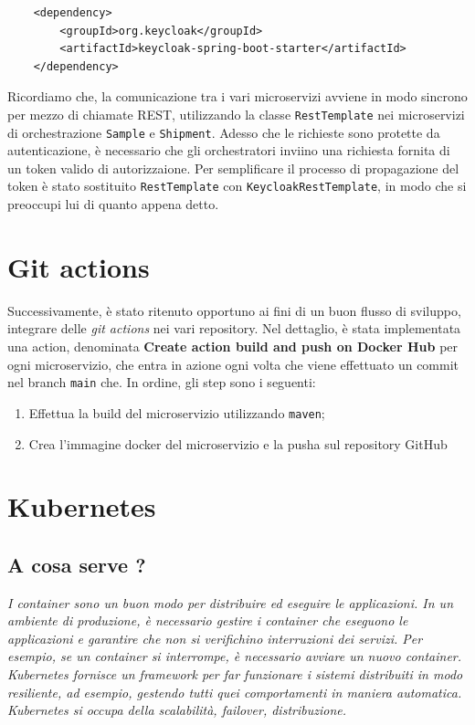 \documentclass{article}
\begin{document}
\begin{verbatim}
    <dependency>
        <groupId>org.keycloak</groupId>
        <artifactId>keycloak-spring-boot-starter</artifactId>
    </dependency>
\end{verbatim}

Ricordiamo che, la comunicazione tra i vari microservizi avviene in modo sincrono per mezzo di chiamate REST, utilizzando la classe \texttt{RestTemplate} nei microservizi di orchestrazione \texttt{Sample} e \texttt{Shipment}.
Adesso che le richieste sono protette da autenticazione, è necessario che gli orchestratori inviino una richiesta fornita di un token valido di autorizzaione. Per semplificare il processo di propagazione del token è stato sostituito \texttt{RestTemplate} con \texttt{KeycloakRestTemplate}, in modo che si preoccupi lui di quanto appena detto.

\pagebreak

\section{Git actions}

Successivamente, è stato ritenuto opportuno ai fini di un buon flusso di sviluppo, integrare delle \textit{git actions} nei vari repository.
Nel dettaglio, è stata implementata una action, denominata \textbf{Create action build and push on Docker Hub} per ogni microservizio, che entra in azione ogni volta che viene effettuato un commit nel 
branch \texttt{main} che. In ordine, gli step sono i seguenti:

\begin{enumerate}
    \item Effettua la build del microservizio utilizzando \texttt{maven};
    \item Crea l'immagine docker del microservizio e la pusha sul repository GitHub
\end{enumerate}

\section{Kubernetes}

\subsection{A cosa serve ?}

\textit{
I container sono un buon modo per distribuire ed eseguire le applicazioni. In un ambiente di produzione, è necessario gestire i container che eseguono le applicazioni e garantire che non si verifichino interruzioni dei servizi. Per esempio, se un container si interrompe, è necessario avviare un nuovo container. 
Kubernetes fornisce un framework per far funzionare i sistemi distribuiti in modo resiliente, ad esempio, gestendo
tutti quei comportamenti in maniera automatica. Kubernetes si occupa della scalabilità, failover, distribuzione. 
}
\end{document}
